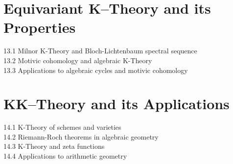 \section{Equivariant K–Theory and its Properties}
13.1 Milnor K-Theory and Bloch-Lichtenbaum spectral sequence\\
13.2 Motivic cohomology and algebraic K-Theory\\
13.3 Applications to algebraic cycles and motivic cohomology
\section{KK–Theory and its Applications}
14.1 K-Theory of schemes and varieties\\
14.2 Riemann-Roch theorems in algebraic geometry\\
14.3 K-Theory and zeta functions\\
14.4 Applications to arithmetic geometry

